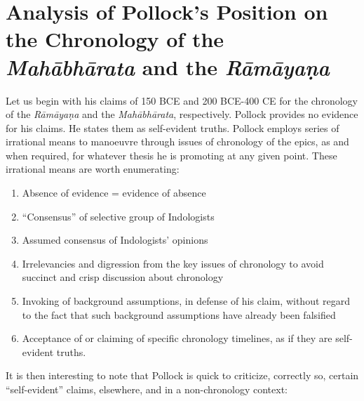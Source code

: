 \section*{Analysis of Pollock’s Position on \hfill\break the Chronology of the \textit{Mahābhārata} and \hfill\break the \textit{Rāmāyaṇa}}

Let us begin with his claims of 150 BCE and 200 BCE-400 CE for the chronology of the \textit{Rāmāyaṇa} and the \textit{Mahābhārata}, respectively. Pollock provides no evidence for his claims. He states them as self-evident truths. Pollock employs series of irrational means to manoeuvre through issues of chronology of the epics, as and when required, for whatever thesis he is promoting at any given point. These irrational means are worth enumerating:

\begin{enumerate}
\itemsep=0pt
\item Absence of evidence = evidence of absence

 \item “Consensus” of selective group of Indologists

 \item Assumed consensus of Indologists’ opinions

 \item Irrelevancies and digression from the key issues of chronology to avoid succinct and crisp discussion about chronology

 \item Invoking of background assumptions, in defense of his claim, without regard to the fact that such background assumptions have already been falsified

 \item Acceptance of or claiming of specific chronology timelines, as if they are self-evident truths.

\end{enumerate}

It is then interesting to note that Pollock is quick to criticize, correctly so, certain “self-evident” claims, elsewhere, and in a non-chronology context:

